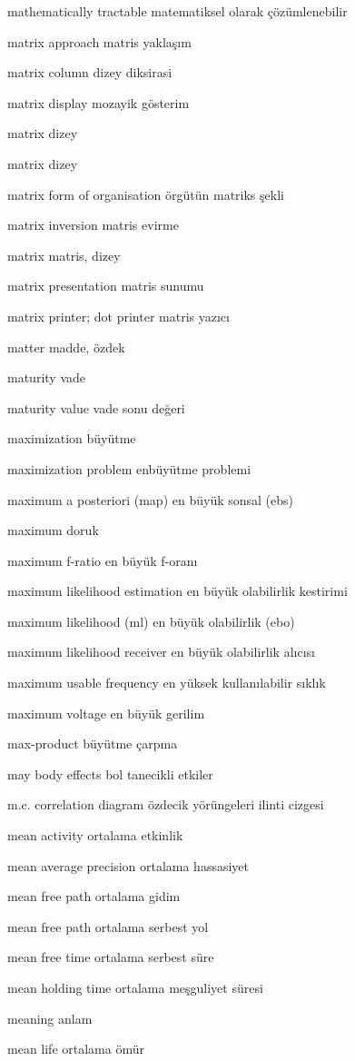 \documentclass[12pt,fleqn]{article}\usepackage{../../common}
\begin{document}
mathematically tractable matematiksel olarak çözümlenebilir

matrix approach matris yaklaşım

matrix column dizey diksirasi

matrix display mozayik gösterim

matrix dizey

matrix dizey

matrix form of organisation örgütün matriks şekli

matrix inversion matris evirme

matrix matris, dizey

matrix presentation matris sunumu

matrix printer; dot printer matris yazıcı

matter madde, özdek

maturity vade

maturity value vade sonu değeri

maximization büyütme

maximization problem enbüyütme problemi

maximum a posteriori (map) en büyük sonsal (ebs)

maximum doruk

maximum f-ratio en büyük f-oranı

maximum likelihood estimation en büyük olabilirlik kestirimi

maximum likelihood (ml) en büyük olabilirlik (ebo)

maximum likelihood receiver en büyük olabilirlik alıcısı

maximum usable frequency en yüksek kullanılabilir sıklık

maximum voltage en büyük gerilim

max-product büyütme çarpma

may body effects bol tanecikli etkiler

m.c. correlation diagram özdecik yörüngeleri ilinti cizgesi

mean activity ortalama etkinlik

mean average precision ortalama hassasiyet

mean free path ortalama gidim

mean free path ortalama serbest yol

mean free time ortalama serbest süre

mean holding time ortalama meşguliyet süresi

meaning anlam

mean life ortalama ömür
\end{document}
